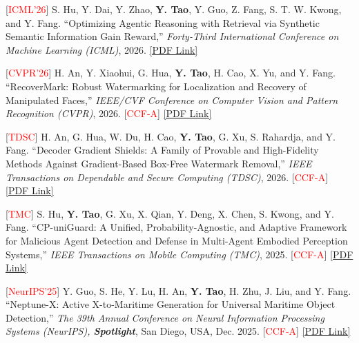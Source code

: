 \documentclass[letterpaper,11pt]{article}
\newcommand{\pdflink}[1]{\href{#1}{[PDF Link]}}
\begin{document}
{{{{{{\begin{justify}
    \normalsize
    [\textcolor{red}{ICML'26}] S. Hu, Y. Dai, Y. Zhao, \textbf{Y. Tao}, Y. Guo, Z. Fang, S. T. W. Kwong, and Y. Fang. ``Optimizing Agentic Reasoning with Retrieval via Synthetic Semantic Information Gain Reward,'' \textit{Forty-Third International Conference on Machine Learning (ICML)}, 2026. \pdflink{https://arxiv.org/pdf/2602.00845}
\end{justify}

\begin{justify}
    \normalsize
    [\textcolor{red}{CVPR'26}] H. An, Y. Xiaohui, G. Hua, \textbf{Y. Tao}, H. Cao, X. Yu, and Y. Fang. ``RecoverMark: Robust Watermarking for Localization and Recovery of Manipulated Faces,'' \textit{IEEE/CVF Conference on Computer Vision and Pattern Recognition (CVPR)}, 2026. [\textcolor{red}{CCF-A}] \pdflink{https://openaccess.thecvf.com/content/CVPR2026/papers/An_RecoverMark_Robust_Watermarking_for_Localization_and_Recovery_of_Manipulated_Faces_CVPR_2026_paper.pdf}
\end{justify}

\begin{justify}
    \normalsize
    [\textcolor{red}{TDSC}] H. An, G. Hua, W. Du, H. Cao, \textbf{Y. Tao}, G. Xu, S. Rahardja, and Y. Fang. ``Decoder Gradient Shields: A Family of Provable and High-Fidelity Methods Against Gradient-Based Box-Free Watermark Removal,'' \textit{IEEE Transactions on Dependable and Secure Computing (TDSC)}, 2026. [\textcolor{red}{CCF-A}] \pdflink{https://ieeexplore.ieee.org/abstract/document/11328834/}
\end{justify}

\begin{justify}
    \normalsize
    [\textcolor{red}{TMC}] S. Hu, \textbf{Y. Tao}, G. Xu, X. Qian, Y. Deng, X. Chen, S. Kwong, and Y. Fang. ``CP-uniGuard: A Unified, Probability-Agnostic, and Adaptive Framework for Malicious Agent Detection and Defense in Multi-Agent Embodied Perception Systems,'' \textit{IEEE Transactions on Mobile Computing (TMC)}, 2025. [\textcolor{red}{CCF-A}] \pdflink{https://arxiv.org/pdf/2506.22890}
\end{justify}

\begin{justify}
    \normalsize
    [\textcolor{red}{NeurIPS'25}] Y. Guo, S. He, Y. Lu, H. An, \textbf{Y. Tao}, H. Zhu, J. Liu, and Y. Fang. ``Neptune-X: Active X-to-Maritime Generation for Universal Maritime Object Detection,'' \textit{The 39th Annual Conference on Neural Information Processing Systems (NeurIPS), \textbf{Spotlight}}, San Diego, USA, Dec. 2025. [\textcolor{red}{CCF-A}] \pdflink{https://arxiv.org/pdf/2509.20745}
\end{justify}

}}}}}}
\end{document}
